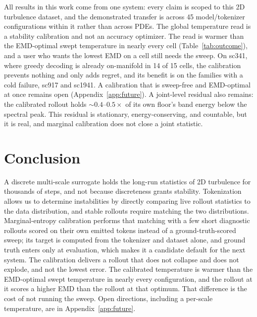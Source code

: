 \documentclass{article}
\begin{document}
All results in this work come from one system: every claim is scoped to this 2D turbulence
dataset, and the demonstrated transfer is across 45 model/tokenizer configurations within
it rather than across PDEs. The global temperature read is a stability calibration and not an
accuracy optimizer. The read is warmer than the EMD-optimal swept temperature in nearly every
cell (Table~\ref{tab:outcome}), and a user who wants the lowest EMD on a cell still needs the
sweep. On sc341, where greedy decoding is already on-manifold in 14 of 15 cells, the
calibration prevents nothing and only adds regret, and its benefit is on the families with a
cold failure, sc917 and sc1941. A
calibration that is sweep-free and EMD-optimal at once remains open
(Appendix~\ref{app:future}). A
joint-level residual also remains: the calibrated rollout holds ${\sim}0.4$--$0.5{\times}$
of its own floor's band energy below the spectral peak. This residual is stationary,
energy-conserving, and countable, but it is real, and marginal calibration does not close
a joint statistic.

\section{Conclusion}
\label{sec:conclusion}

A discrete multi-scale surrogate holds the long-run statistics of 2D turbulence for
thousands of steps, and not because discreteness grants stability. Tokenization allows us
to determine instabilities by directly comparing live rollout statistics to the data
distribution, and stable rollouts require matching the two distributions. Marginal-entropy
calibration performs that matching with a few short diagnostic rollouts scored on their
own emitted tokens instead of a ground-truth-scored sweep; its target is computed from
the tokenizer and dataset alone, and ground truth enters only at evaluation, which makes
it a candidate default for the next system.
The calibration delivers a rollout that does not collapse and does not explode, and not
the lowest error. The calibrated temperature is warmer than the EMD-optimal swept
temperature in nearly every configuration, and the rollout at it scores a higher EMD than the
rollout at that optimum. That difference is the cost of not running the sweep. Open directions, including a per-scale
temperature, are in Appendix~\ref{app:future}.


\newpage

\raggedbottom


\end{document}
